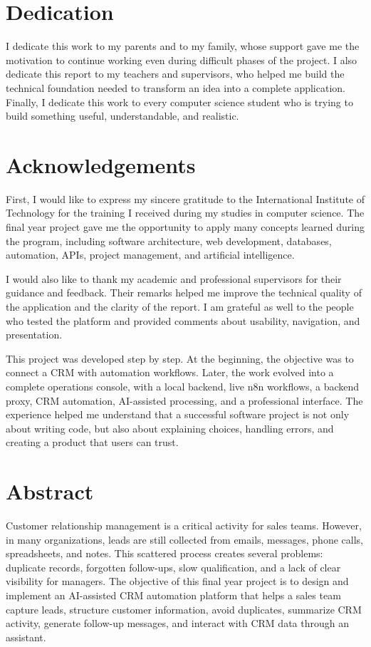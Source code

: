 \documentclass[12pt,a4paper,oneside]{report}
\begin{document}

\chapter*{Dedication}
I dedicate this work to my parents and to my family, whose support gave me the motivation to continue working even during difficult phases of the project. I also dedicate this report to my teachers and supervisors, who helped me build the technical foundation needed to transform an idea into a complete application. Finally, I dedicate this work to every computer science student who is trying to build something useful, understandable, and realistic.

\clearpage
\chapter*{Acknowledgements}
First, I would like to express my sincere gratitude to the International Institute of Technology for the training I received during my studies in computer science. The final year project gave me the opportunity to apply many concepts learned during the program, including software architecture, web development, databases, automation, APIs, project management, and artificial intelligence.

I would also like to thank my academic and professional supervisors for their guidance and feedback. Their remarks helped me improve the technical quality of the application and the clarity of the report. I am grateful as well to the people who tested the platform and provided comments about usability, navigation, and presentation.

This project was developed step by step. At the beginning, the objective was to connect a CRM with automation workflows. Later, the work evolved into a complete operations console, with a local backend, live n8n workflows, a backend proxy, CRM automation, AI-assisted processing, and a professional interface. The experience helped me understand that a successful software project is not only about writing code, but also about explaining choices, handling errors, and creating a product that users can trust.

\clearpage
\chapter*{Abstract}
Customer relationship management is a critical activity for sales teams. However, in many organizations, leads are still collected from emails, messages, phone calls, spreadsheets, and notes. This scattered process creates several problems: duplicate records, forgotten follow-ups, slow qualification, and a lack of clear visibility for managers. The objective of this final year project is to design and implement an AI-assisted CRM automation platform that helps a sales team capture leads, structure customer information, avoid duplicates, summarize CRM activity, generate follow-up messages, and interact with CRM data through an assistant.
\end{document}
